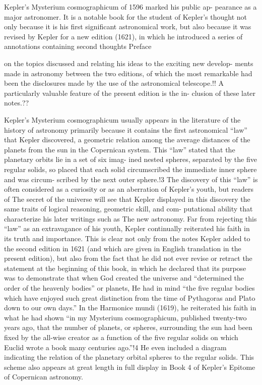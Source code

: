\documentclass{article}
\begin{document}
Kepler’s Mysterium cosmographicum of 1596 marked his public ap-
pearance as a major astronomer. It is a notable book for the student of
Kepler’s thought not only because it is his first significant astronomical
work, but also because it was revised by Kepler for a new edition (1621), in
which he introduced a series of annotations containing second thoughts
Preface

on the topics discussed and relating his ideas to the exciting new develop-
ments made in astronomy between the two editions, of which the most
remarkable had been the disclosures made by the use of the astronomical
telescope.!! A particularly valuable feature of the present edition is the in-
clusion of these later notes.??

Kepler’s Mysterium cosmographicum usually appears in the literature
of the history of astronomy primarily because it contains the first
astronomical “law” that Kepler discovered, a geometric relation among
the average distances of the planets from the sun in the Copernican
system. This “law” stated that the planetary orbits lie in a set of six imag-
ined nested spheres, separated by the five regular solids, so placed that
each solid circumscribed the immediate inner sphere and was circum-
scribed by the next outer sphere.!3 The discovery of this “law” is often
considered as a curiosity or as an aberration of Kepler’s youth, but readers
of The secret of the universe will see that Kepler displayed in this
discovery the same traits of logical reasoning, geometric skill, and com-
putational ability that characterize his later writings such as The new
astronomy. Far from rejecting this “law” as an extravagance of his youth,
Kepler continually reiterated his faith in its truth and importance. This is
clear not only from the notes Kepler added to the second edition in 1621
(and which are given in English translation in the present edition), but
also from the fact that he did not ever revise or retract the statement at the
beginning of this book, in which he declared that its purpose was to
demonstrate that when God created the universe and “determined the
order of the heavenly bodies” or planets, He had in mind “the five regular
bodies which have enjoyed such great distinction from the time of
Pythagoras and Plato down to our own days.” In the Harmonice mundi
(1619), he reiterated his faith in what he had shown “in my Mysterium
cosmographicum, published twenty-two years ago, that the number of
planets, or spheres, surrounding the sun had been fixed by the all-wise
creator as a function of the five regular solids on which Euclid wrote a
book many centuries ago.”!4 He even included a diagram indicating the
relation of the planetary orbital spheres to the regular solids. This scheme
also appears at great length in full display in Book 4 of Kepler’s Epitome
of Copernican astronomy.
\end{document}
